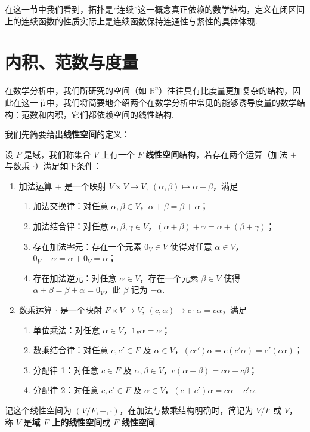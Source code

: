 \documentclass[../main.tex]{subfiles}
\begin{document}
在这一节中我们看到，拓扑是“连续”这一概念真正依赖的数学结构，定义在闭区间上的连续函数的性质实际上是连续函数保持连通性与紧性的具体体现. 

\section{内积、范数与度量}

在数学分析中，我们所研究的空间（如 $\mathbb R^n$）往往具有比度量更加复杂的结构，因此在这一节中，我们将简要地介绍两个在数学分析中常见的能够诱导度量的数学结构：范数和内积，它们都依赖空间的线性结构. 

我们先简要给出\textbf{线性空间}的定义：

\begin{definition}[线性空间的定义] 
    设 $F$ 是域，我们称集合 $V$ 上有一个 $F$ \textbf{线性空间}结构，若存在两个运算（加法 $+$ 与数乘 $\cdot$）满足如下条件：
    \begin{enumerate}[label = (\arabic*)]
        \item 加法运算 $+$ 是一个映射 $V \times V \to V,\ (\alpha, \beta) \mapsto \alpha + \beta$，满足
        \begin{enumerate}
            \item 加法交换律：对任意 $\alpha, \beta \in V$，$\alpha + \beta = \beta + \alpha$；  
            \item 加法结合律：对任意 $\alpha, \beta, \gamma \in V$，$(\alpha + \beta) + \gamma = \alpha + (\beta + \gamma)$；  
            \item 存在加法零元：存在一个元素 $0_V \in V$ 使得对任意 $\alpha \in V$，$0_V + \alpha = \alpha + 0_V = \alpha$；  
            \item 存在加法逆元：对任意 $\alpha \in V$，存在一个元素 $\beta \in V$ 使得 $\alpha + \beta = \beta + \alpha = 0_V$，此 $\beta$ 记为 $-\alpha$. 
        \end{enumerate}

        \item 数乘运算 $\cdot$ 是一个映射 $F \times V \to V,\ (c, \alpha) \mapsto c \cdot \alpha = c \alpha$，满足
        \begin{enumerate}
            \item 单位乘法：对任意 $\alpha \in V$，$1_F \alpha = \alpha$；  
            \item 数乘结合律：对任意 $c, c' \in F$ 及 $\alpha \in V$，$(cc') \alpha = c(c' \alpha) = c' (c \alpha)$；  
            \item 分配律 1：对任意 $c \in F$ 及 $\alpha, \beta \in V$，$c(\alpha + \beta) = c \alpha + c \beta$；  
            \item 分配律 2：对任意 $c, c' \in F$ 及 $\alpha \in V$，$(c + c') \alpha = c \alpha + c' \alpha$.   
        \end{enumerate}
    \end{enumerate}
    记这个线性空间为 $(V/F, +, \cdot)$，在加法与数乘结构明确时，简记为 $V/F$ 或 $V$，称 $V$ 是\textbf{域 $F$ 上的线性空间}或 $F$ \textbf{线性空间}. 
\end{definition}
\end{document}
